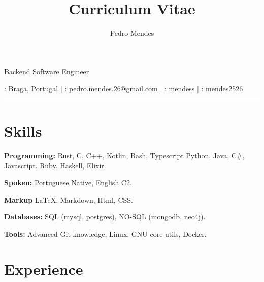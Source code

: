 \documentclass{article}
\makeatletter
\renewcommand{\maketitle}
{
    \begin{center}
        {\huge\bfseries\theauthor}

        \vspace{.25em}

        \Large{Backend Software Engineer}

        \vspace{.25em}

        \large{\thetitle}

        \vspace{.25em}

        \faMapMarker: Braga, Portugal |
        \href{mailto:pedro.mendes.26@gmail.com}{\faEnvelope: pedro.mendes.26@gmail.com} |
        \href{https://github.com/mendess}{\faGithub: mendess} |
        \href{https://www.linkedin.com/in/mendes2526/}{\faLinkedinSquare: mendes2526}

    \end{center}
}
\makeatother
\begin{document}
\title{Curriculum Vitae}
\author{Pedro Mendes}

\maketitle

\hrule

\section{Skills}

\begin{multicols}{2}

    \textbf{Programming:} Rust, C, C++, Kotlin, Bash, Typescript Python, Java, C\#,
    Javascript, Ruby, Haskell, Elixir.

    \textbf{Spoken:} Portuguese Native, English C2.

    \textbf{Markup} \LaTeX, Markdown, Html, CSS\@.

    \textbf{Databases:} SQL (mysql, postgres), NO-SQL (mongodb, neo4j).

    \textbf{Tools:} Advanced Git knowledge, Linux, GNU core utils, Docker.

\end{multicols}

\section{Experience}
\end{document}
